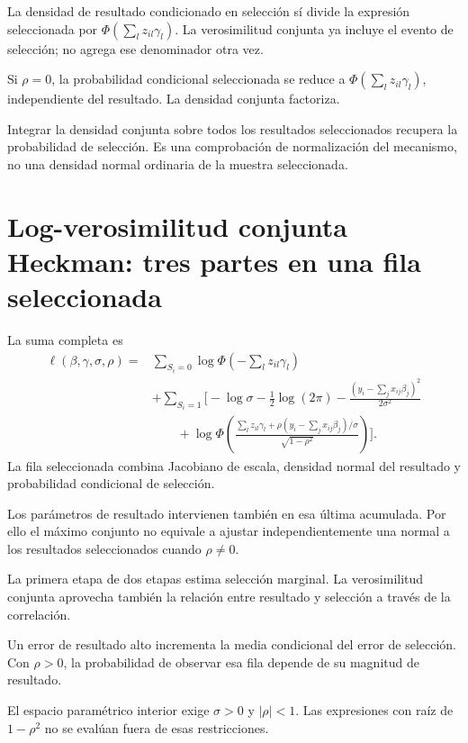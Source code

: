 \documentclass[11pt,a4paper]{article}
\begin{document}
La densidad de resultado
condicionado en selección sí
divide la expresión seleccionada
por \(\Phi(\sum_lz_{il}\gamma_l)\).
La verosimilitud conjunta ya
incluye el evento de selección;
no agrega ese denominador
otra vez.

\begin{ejemplo}[Independencia]
Si \(\rho=0\), la probabilidad
condicional seleccionada se
reduce a \(\Phi(\sum_lz_{il}\gamma_l)\),
independiente del resultado.
La densidad conjunta factoriza.
\end{ejemplo}
Integrar la densidad conjunta
sobre todos los resultados
seleccionados recupera
la probabilidad de selección.
Es una comprobación de
normalización del mecanismo,
no una densidad normal
ordinaria de la muestra seleccionada.

\clearpage
\section{Log-verosimilitud conjunta Heckman: tres partes en una fila seleccionada}\label{unidad142}
La suma completa es
\[
\begin{aligned}
\ell(\beta,\gamma,\sigma,\rho)
={}&\sum_{S_i=0}\log\Phi(-\sum_lz_{il}\gamma_l)\\
&+\sum_{S_i=1}\Bigg[
-\log\sigma-\frac12\log(2\pi)
-\frac{(y_i-\sum_jx_{ij}\beta_j)^2}{2\sigma^2}\\
&\qquad+
\log\Phi\left(
\frac{\sum_lz_{il}\gamma_l+
\rho(y_i-\sum_jx_{ij}\beta_j)/\sigma}
{\sqrt{1-\rho^2}}\right)
\Bigg].
\end{aligned}
\]
La fila seleccionada combina
Jacobiano de escala, densidad
normal del resultado y
probabilidad condicional de selección.

Los parámetros de resultado
intervienen también en esa
última acumulada.
Por ello el máximo conjunto
no equivale a ajustar
independientemente una normal
a los resultados seleccionados
cuando \(\rho\ne0\).

La primera etapa de dos etapas
estima selección marginal.
La verosimilitud conjunta
aprovecha también la relación
entre resultado y selección
a través de la correlación.

\begin{ejemplo}
Un error de resultado alto
incrementa la media condicional
del error de selección.
Con \(\rho>0\),
la probabilidad de observar
esa fila depende de su
magnitud de resultado.
\end{ejemplo}
El espacio paramétrico interior
exige \(\sigma>0\) y \(|\rho|<1\).
Las expresiones con raíz
de \(1-\rho^2\) no
se evalúan fuera de
esas restricciones.
\end{document}
